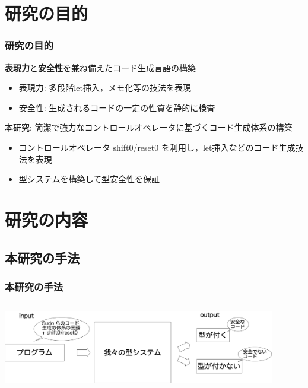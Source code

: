 
\section{研究の目的}
\begin{frame}
  \frametitle{研究の目的}

  \begin{block}{\textbf{表現力}と\textbf{安全性}を兼ね備えたコード生成言語の構築}
    \begin{itemize}
    \item 表現力: 多段階let挿入，メモ化等の技法を表現
    \item 安全性: 生成されるコードの一定の性質を静的に検査
    \end{itemize}
  \end{block}

  \medskip
  \pause
  \begin{block}{本研究: 簡潔で強力なコントロールオペレータに基づくコード生成体系の構築}
    \begin{itemize}
    \item コントロールオペレータ shift0/reset0 を利用し，let挿入などのコード生成技法を表現
    \item 型システムを構築して型安全性を保証
    \end{itemize}
  \end{block}
\end{frame}

\section{研究の内容}
\subsection{本研究の手法}
\begin{frame}
  \frametitle{本研究の手法}
  \begin{columns}
    \begin{column}{1.\textwidth}%
      \center
      \includegraphics[clip,height=3.2cm]{./img/code_s0r0.png}
    \end{column}
  \end{columns}
\end{frame}

